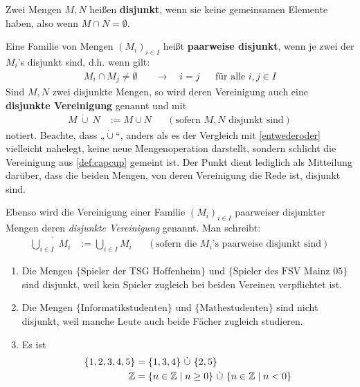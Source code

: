 \begin{defin}[Disjunktheit] \label{def:disjunkt} 
    Zwei Mengen $M,N$ heißen \textbf{disjunkt}, wenn sie keine gemeinsamen Elemente haben, also wenn $M\cap N=\emptyset$.

    Eine Familie von Mengen $(M_i)_{i\in I}$ heißt \textbf{paarweise disjunkt}, wenn je zwei der $M_i$'s disjunkt sind, d.h. wenn gilt:
    \begin{align*}
        M_i\cap M_j \neq  \emptyset \quad& \to\quad i=j &&\text{für alle $i,j\in I$}
    \end{align*}
    Sind $M,N$ zwei disjunkte Mengen, so wird deren Vereinigung auch eine \textbf{disjunkte Vereinigung} genannt und mit
    \begin{align*}
        M\ \dot\cup\ N & := M\cup N && (\text{sofern $M,N$ disjunkt sind})
    \end{align*}
    notiert. Beachte, dass „$\dot\cup$“, anders als es der Vergleich mit \cref{entwederoder} vielleicht nahelegt, keine neue Mengenoperation darstellt, sondern schlicht die Vereinigung aus \cref{def:capcup} gemeint ist. Der Punkt dient lediglich als Mitteilung darüber, dass die beiden Mengen, von deren Vereinigung die Rede ist, disjunkt sind.

    Ebenso wird die Vereinigung einer Familie $(M_i)_{i\in I}$ paarweiser disjunkter Mengen deren \emph{disjunkte Vereinigung} genannt. Man schreibt:
    \begin{align*}
        \dot{\bigcup_{i\in I}}\ M_i & := \bigcup_{i\in I} M_i && (\text{sofern die $M_i$'s paarweise disjunkt sind})
    \end{align*}
\end{defin}


\begin{bsp} \label{bsp:disjunkt} \quad
    \begin{enumerate}
        \item Die Mengen $\{\text{Spieler der TSG Hoffenheim}\}$ und $\{\text{Spieler des FSV Mainz 05}\}$ sind disjunkt, weil kein Spieler zugleich bei beiden Vereinen verpflichtet ist.
        \item Die Mengen $\{\text{Informatikstudenten}\}$ und $\{\text{Mathestudenten}\}$ sind nicht disjunkt, weil manche Leute auch beide Fächer zugleich studieren.
        \item Es ist
        \begin{align*}
        \{1,2,3,4,5\} & = \{1,3,4\}\ \dot\cup\ \{2,5\} \\
        \mathbb Z & = \{n\in \mathbb Z\mid n\ge 0\} \ \dot\cup\ \{n\in \mathbb Z\mid n<0\}
        \end{align*}
    \end{enumerate}
\end{bsp}


